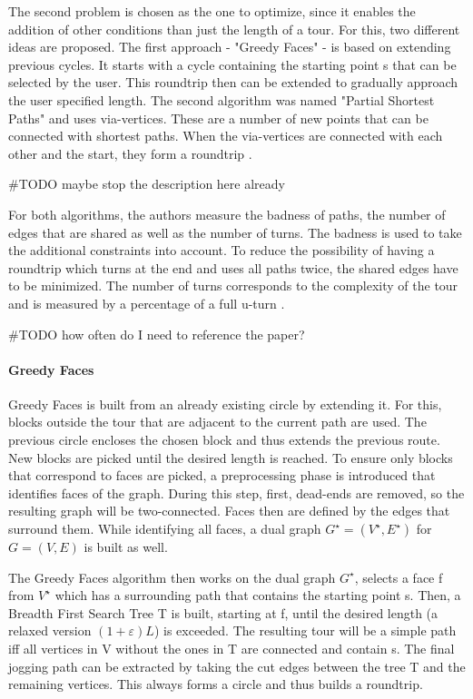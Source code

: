 The second problem is chosen as the one to optimize, since it enables the addition of other conditions than just the length of a tour.
For this, two different ideas are proposed.
The first approach - "Greedy Faces" - is based on extending previous cycles.
It starts with a cycle containing the starting point s that can be selected by the user. 
This roundtrip then can be extended to gradually approach the user specified length. 
The second algorithm was named "Partial Shortest Paths" and uses via-vertices.
These are a number of new points that can be connected with shortest paths.
When the via-vertices are connected with each other and the start, they form a roundtrip \cite{gemsa_efficient_2013}.

\#TODO maybe stop the description here already


For both algorithms, the authors measure the badness of paths, the number of edges that are shared as well as the number of turns.
The badness is used to take the additional constraints into account. 
To reduce the possibility of having a roundtrip which turns at the end and uses all paths twice, the shared edges have to be minimized.
The number of turns corresponds to the complexity of the tour and is measured by a percentage of a full u-turn \cite{gemsa_efficient_2013}. 

\#TODO how often do I need to reference the paper?


\paragraph{Greedy Faces}

Greedy Faces is built from an already existing circle by extending it.
For this, blocks outside the tour that are adjacent to the current path are used.
The previous circle encloses the chosen block and thus extends the previous route. 
New blocks are picked until the desired length is reached.
To ensure only blocks that correspond to faces are picked, a preprocessing phase is introduced that identifies faces of the graph.
During this step, first, dead-ends are removed, so the resulting graph will be two-connected.
Faces then are defined by the edges that surround them. 
While identifying all faces, a dual graph $G^{\star} = (V^{\star},E^{\star})$ for $G = (V,E)$ is built as well.

The Greedy Faces algorithm then works on the dual graph $G^{\star}$, selects a face f from $V^{\star}$ which has a surrounding path that contains the starting point s. 
Then, a Breadth First Search Tree T is built, starting at f, until the desired length (a relaxed version $(1 + \varepsilon) L$) is exceeded.
The resulting tour will be a simple path iff all vertices in V without the ones in T are connected and contain s.
The final jogging path can be extracted by taking the cut edges between the tree T and the remaining vertices.
This always forms a circle and thus builds a roundtrip.


